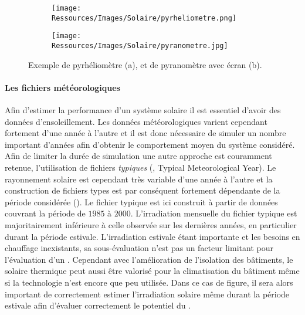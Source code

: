 \begin{figure}
    \centering
    \begin{subfigure}[b]{0.45\textwidth}
        \centering
        \texttt{[image: Ressources/Images/Solaire/pyrheliometre.png]}
        \caption{}
        \label{fig:schema_pyrheliometre}
    \end{subfigure}
    \quad
    \begin{subfigure}[b]{0.45\textwidth}
        \centering
        \texttt{[image: Ressources/Images/Solaire/pyranometre.jpg]}
        \caption{}
        \label{fig:schema_pyranometre}
    \end{subfigure}
    \caption[Exemple de pyrhéliomètre et de pyranomètre avec écran]
             {Exemple de pyrhéliomètre (a), et de pyranomètre avec écran (b).}
    \label{fig:image_mesure_rayonnement}
\end{figure}

\paragraph{Les fichiers météorologiques} %
\label{par:les_fichiers_meteorologiques}
Afin d’estimer la performance d’un système solaire il est essentiel d’avoir des données
d’ensoleillement. Les données météorologiques varient cependant fortement d’une année à
l’autre et il est donc nécessaire de simuler un nombre important d’années afin d’obtenir
le comportement moyen du système considéré. Afin de limiter la durée de simulation une
autre approche est couramment retenue, l’utilisation de fichiers \textit{typiques}
(, Typical Meteorological Year). Le rayonnement solaire est cependant
très variable d’une année à l’autre et la construction de fichiers types est par
conséquent fortement dépendante de la période considérée ().
Le fichier typique est ici construit à partir de données couvrant la période de $1985$ à
$2000$. L’irradiation mensuelle du fichier typique est majoritairement inférieure à celle
observée sur les dernières années, en particulier durant la période estivale.
L’irradiation estivale étant importante et les besoins en chauffage inexistants, sa
sous-évaluation n’est pas un facteur limitant pour l’évaluation d’un . Cependant
avec l’amélioration de l’isolation des bâtiments, le solaire thermique peut aussi être
valorisé pour la climatisation du bâtiment même si la technologie n’est encore que peu
utilisée. Dans ce cas de figure, il sera alors important de correctement estimer l’irradiation
solaire même durant la période estivale afin d’évaluer correctement le potentiel du .

